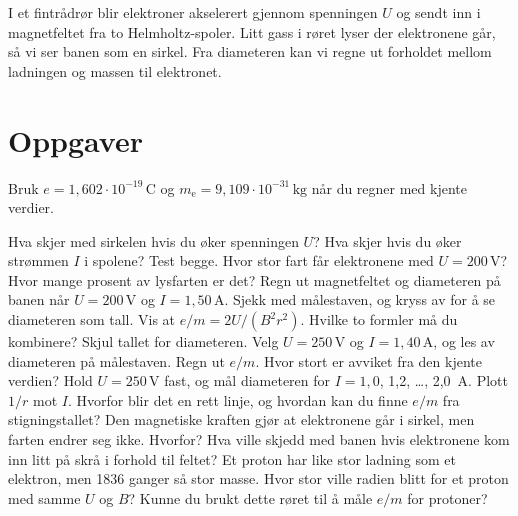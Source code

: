 \documentclass[11pt]{article}
\begin{document}

I et fintrådrør blir elektroner akselerert gjennom spenningen $U$ og sendt inn i magnetfeltet fra to Helmholtz-spoler. Litt gass i røret lyser der elektronene går, så vi ser banen som en sirkel. Fra diameteren kan vi regne ut forholdet mellom ladningen og massen til elektronet.

\section*{Oppgaver}

Bruk $e = 1{,}602 \cdot 10^{-19}\,\mathrm{C}$ og $m_{\mathrm{e}} = 9{,}109 \cdot 10^{-31}\,\mathrm{kg}$ når du regner med kjente verdier.

\begin{oppgaveliste}
\oppgave {}Hva skjer med sirkelen hvis du øker spenningen $U$? Hva skjer hvis du øker strømmen $I$ i spolene? Test begge.
\svar
\oppgave {}Hvor stor fart får elektronene med $U = 200\,\mathrm{V}$? Hvor mange prosent av lysfarten er det?
\svar
\oppgave {}Regn ut magnetfeltet og diameteren på banen når $U = 200\,\mathrm{V}$ og $I = 1{,}50\,\mathrm{A}$. Sjekk med målestaven, og kryss av for å se diameteren som tall.
\svar
\oppgave {}Vis at $e/m = 2U/(B^{2}r^{2})$. Hvilke to formler må du kombinere?
\svar
\oppgave {}Skjul tallet for diameteren. Velg $U = 250\,\mathrm{V}$ og $I = 1{,}40\,\mathrm{A}$, og les av diameteren på målestaven. Regn ut $e/m$. Hvor stort er avviket fra den kjente verdien?
\svar
\oppgave {}Hold $U = 250\,\mathrm{V}$ fast, og mål diameteren for $I = 1{,}0$, 1,2, …, 2,0~A. Plott $1/r$ mot $I$. Hvorfor blir det en rett linje, og hvordan kan du finne $e/m$ fra stigningstallet?
\svar
\oppgave {}Den magnetiske kraften gjør at elektronene går i sirkel, men farten endrer seg ikke. Hvorfor? Hva ville skjedd med banen hvis elektronene kom inn litt på skrå i forhold til feltet?
\svar
\oppgave {}Et proton har like stor ladning som et elektron, men 1836 ganger så stor masse. Hvor stor ville radien blitt for et proton med samme $U$ og $B$? Kunne du brukt dette røret til å måle $e/m$ for protoner?
\svar
\end{oppgaveliste}
\end{document}
